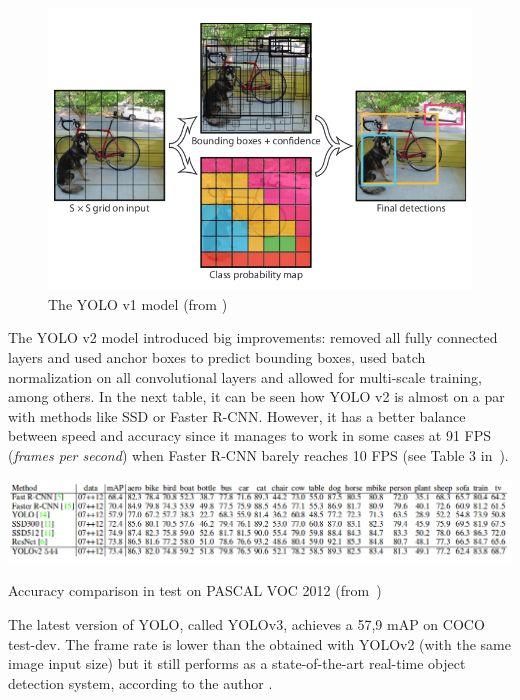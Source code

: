 \begin{itemize}
\begin{figure}[H]
\begin{center}
\includegraphics[scale=0.3]{figures/yolov1.png}
\caption{The YOLO v1 model (from \cite{redmon2016you})}
\label{fig:yolo}
\end{center}
\end{figure}
The YOLO v2 model introduced big improvements: removed all fully connected layers and used anchor boxes to predict bounding boxes, used batch normalization on all convolutional layers and allowed for multi-scale training, among others. In the next table, it can be seen how YOLO v2 is almost on a par with methods like SSD or Faster R-CNN. However, it has a better balance between speed and accuracy since it manages to work in some cases at 91 FPS (\textit{frames per second}) when Faster R-CNN barely reaches 10 FPS (see Table 3 in~\cite{redmon2017yolo9000}).
\begin{table}[H]
\begin{center}
\includegraphics[scale=0.45]{previous_version/yolo_results_pascal12.png}
\caption{Accuracy comparison in test on PASCAL VOC 2012 (from~\cite{redmon2017yolo9000})}
\end{center}
\label{table_yolo}
\end{table}
 The latest version of YOLO, called YOLOv3, achieves a 57,9 mAP on COCO test-dev. The frame rate is lower than the obtained with YOLOv2 (with the same image input size) but it still performs as a state-of-the-art real-time object detection system, according to the author \cite{redmon2018yolov3}.
 \end{itemize}
